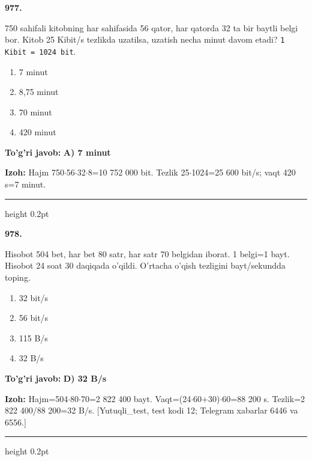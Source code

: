 \documentclass[10pt,a4paper,oneside]{article}
\begin{document}
\noindent\textbf{\color{ink}977.}
\par
750 sahifali kitobning har sahifasida 56 qator, har qatorda 32 ta bir baytli belgi bor. Kitob 25 Kibit/s tezlikda uzatilsa, uzatish necha minut davom etadi? \texttt{1 Kibit = 1024 bit}.
\begin{enumerate}[label=\Alph*),leftmargin=9mm]
\item 7 minut
\item 8,75 minut
\item 70 minut
\item 420 minut
\end{enumerate}
\begin{tcolorbox}[enhanced,breakable,colback=teal!4,colframe=teal!50!black,boxrule=0.5pt,arc=1.1mm,left=3mm,right=3mm,top=1.7mm,bottom=1.7mm,before skip=2mm,after skip=2mm]
\textbf{\color{teal}To'g'ri javob:} \textbf{A) 7 minut}
\par\smallskip
\textbf{Izoh:} Hajm 750\ensuremath{\cdot}56\ensuremath{\cdot}32\ensuremath{\cdot}8=10 752 000 bit. Tezlik 25\ensuremath{\cdot}1024=25 600 bit/s; vaqt 420 s=7 minut.
\end{tcolorbox}
\vspace{2mm}\hrule height 0.2pt \vspace{3mm}

\noindent\textbf{\color{ink}978.}
\par
Hisobot 504 bet, har bet 80 satr, har satr 70 belgidan iborat. 1 belgi=1 bayt. Hisobot 24 soat 30 daqiqada o'qildi. O'rtacha o'qish tezligini bayt/sekundda toping.
\begin{enumerate}[label=\Alph*),leftmargin=9mm]
\item 32 bit/s
\item 56 bit/s
\item 115 B/s
\item 32 B/s
\end{enumerate}
\begin{tcolorbox}[enhanced,breakable,colback=teal!4,colframe=teal!50!black,boxrule=0.5pt,arc=1.1mm,left=3mm,right=3mm,top=1.7mm,bottom=1.7mm,before skip=2mm,after skip=2mm]
\textbf{\color{teal}To'g'ri javob:} \textbf{D) 32 B/s}
\par\smallskip
\textbf{Izoh:} Hajm=504\ensuremath{\cdot}80\ensuremath{\cdot}70=2 822 400 bayt. Vaqt=(24\ensuremath{\cdot}60+30)\ensuremath{\cdot}60=88 200 s. Tezlik=2 822 400/88 200=32 B/s. [Yutuqli\_test, test kodi 12; Telegram xabarlar 6446 va 6556.]
\end{tcolorbox}
\vspace{2mm}\hrule height 0.2pt \vspace{3mm}
\end{document}

